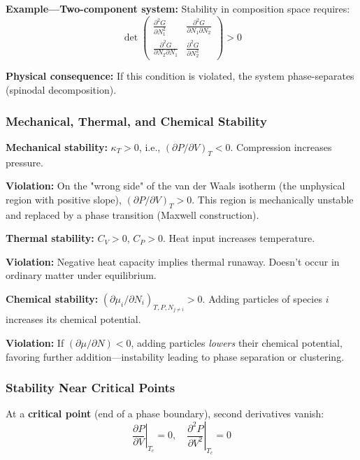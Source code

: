 \documentclass[9pt,twocoloumn]{article}
\begin{document}
\textbf{Example—Two-component system:} Stability in composition space requires:
\begin{equation}
\det \begin{pmatrix}
\frac{\partial^2 G}{\partial N_1^2} & \frac{\partial^2 G}{\partial N_1 \partial N_2} \\
\frac{\partial^2 G}{\partial N_2 \partial N_1} & \frac{\partial^2 G}{\partial N_2^2}
\end{pmatrix} > 0
\end{equation}

\textbf{Physical consequence:} If this condition is violated, the system phase-separates (spinodal decomposition).

\subsubsection{Mechanical, Thermal, and Chemical Stability}

\textbf{Mechanical stability:} $\kappa_T > 0$, i.e., $(\partial P/\partial V)_T < 0$. Compression increases pressure.

\textbf{Violation:} On the "wrong side" of the van der Waals isotherm (the unphysical region with positive slope), $(\partial P/\partial V)_T > 0$. This region is mechanically unstable and replaced by a phase transition (Maxwell construction).

\textbf{Thermal stability:} $C_V > 0$, $C_P > 0$. Heat input increases temperature.

\textbf{Violation:} Negative heat capacity implies thermal runaway. Doesn't occur in ordinary matter under equilibrium.

\textbf{Chemical stability:} $(\partial \mu_i / \partial N_i)_{T,P,N_{j \neq i}} > 0$. Adding particles of species $i$ increases its chemical potential.

\textbf{Violation:} If $(\partial \mu / \partial N) < 0$, adding particles \emph{lowers} their chemical potential, favoring further addition—instability leading to phase separation or clustering.

\subsubsection{Stability Near Critical Points}

At a \textbf{critical point} (end of a phase boundary), second derivatives vanish:
\begin{equation}
\left. \frac{\partial P}{\partial V} \right|_{T_c} = 0, \quad \left. \frac{\partial^2 P}{\partial V^2} \right|_{T_c} = 0
\end{equation}
\end{document}
